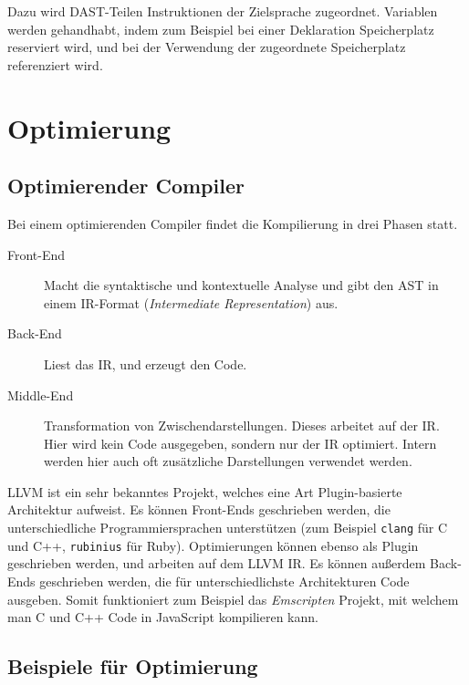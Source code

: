 \documentclass[ngerman]{scrartcl}
\begin{document}
Dazu wird DAST-Teilen Instruktionen der Zielsprache zugeordnet. Variablen werden gehandhabt, indem zum Beispiel bei einer Deklaration Speicherplatz reserviert wird, und bei der Verwendung der zugeordnete Speicherplatz referenziert wird.

\section{Optimierung}

\subsection{Optimierender Compiler}


Bei einem optimierenden Compiler findet die Kompilierung in drei Phasen statt.

\begin{description}
\item[Front-End] Macht die syntaktische und kontextuelle Analyse und gibt den AST in einem IR-Format (\emph{Intermediate Representation}) aus.
\item[Back-End] Liest das IR, und erzeugt den Code.
\item[Middle-End] Transformation von Zwischendarstellungen. Dieses arbeitet auf der IR. Hier wird kein Code ausgegeben, sondern nur der IR optimiert. Intern werden hier auch oft zusätzliche Darstellungen verwendet werden.
\end{description}

\begin{anmerkung}
LLVM ist ein sehr bekanntes Projekt, welches eine Art Plugin-basierte Architektur aufweist. Es können Front-Ends geschrieben werden, die unterschiedliche Programmiersprachen unterstützen (zum Beispiel \verb|clang| für C und C++, \verb|rubinius| für Ruby). Optimierungen können ebenso als Plugin geschrieben werden, und arbeiten auf dem LLVM IR. Es können außerdem Back-Ends geschrieben werden, die für unterschiedlichste Architekturen Code ausgeben. Somit funktioniert zum Beispiel das \emph{Emscripten} Projekt, mit welchem man C und C++ Code in JavaScript kompilieren kann.
\end{anmerkung}

\subsection{Beispiele für Optimierung}
\end{document}

